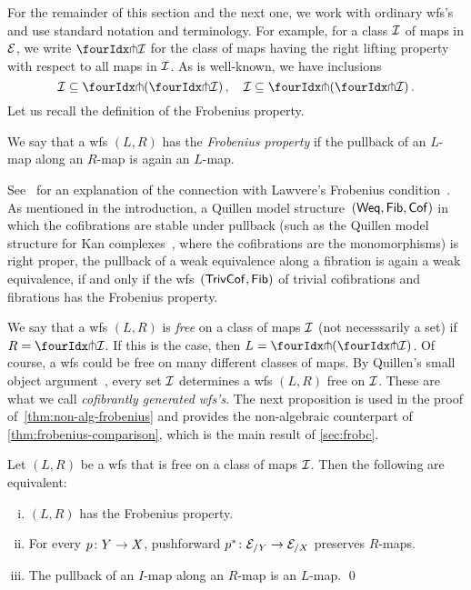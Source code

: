 \documentclass[reqno,10pt,a4paper,oneside,draft]{amsart}
\begin{document}
For the remainder of this section and the next one, we work with ordinary wfs's~\cite{bousfield-wfs} and use standard notation and terminology.
For example, for a class $\cal{I}$ of maps in $\cal{E}$, we write $\liftr{\cal{I}}$ for the class of maps having the right lifting property with respect to all maps in $\cal{I}$.
As is well-known, we have inclusions
\begin{equation} \label{equ:inclus-orthog}
\cal{I} \subseteq \liftl{(\liftr{\cal{I}})}
\, , \quad
\cal{I} \subseteq \liftr{(\liftl{\cal{I}})}
\, .\end{equation}
Let us recall the definition of the Frobenius property.

\begin{definition}
We say that a wfs $(L, R)$ has the \emph{Frobenius property} if the pullback of an $L$-map along an $R$-map is again an $L$-map.
\end{definition}

See~\cite{clementino:frobenius} for an explanation of the connection with Lawvere's Frobenius condition~\cite{lawvere-equality}.
As mentioned in the introduction, a Quillen model structure~$(\mathsf{Weq}, \Fib, \Cof)$ in which the cofibrations are stable under pullback (such as the Quillen model structure for Kan complexes~\cite{quillen-homotopical}, where the cofibrations are the monomorphisms) is right proper, \ie the pullback of a weak equivalence along a fibration is again a weak equivalence, if and only if the wfs~$(\TrivCof, \Fib)$ of trivial cofibrations and fibrations has the Frobenius property.

We say that a wfs $(L, R)$ is \emph{free} on a class of maps $\cal{I}$ (not necesssarily a set) if $R = \liftr{\cal{I}}$.
If this is the case, then $L = \liftl{(\liftr{\cal{I}})}$.
Of course, a wfs could be free on many different classes of maps.
By Quillen's small object argument~\cite{quillen-homotopical}, every set $\cal{I}$ determines a wfs $(L, R)$ free on $\cal{I}$.
These are what we call \emph{cofibrantly generated wfs's}.
The next proposition is used in the proof of~\cref{thm:non-alg-frobenius} and provides the non-algebraic counterpart of \cref{thm:frobenius-comparison}, which is the main result of \cref{sec:frobc}.

\begin{proposition} \label{thm:frobenius-equivalence}
Let $(L, R)$ be a wfs that is free on a class of maps $\cal{I}$.
Then the following are equivalent:
\begin{enumerate}[(i)]
\item $(L,R)$ has the Frobenius property.
\item For every $p \co Y \to X$, pushforward $p^* \co \cal{E}_{/Y} \to \cal{E}_{/X}$ preserves $R$-maps.
\item The pullback of an $I$-map along an $R$-map is an $L$-map.
\qed
\end{enumerate}
\end{proposition}
\end{document}
